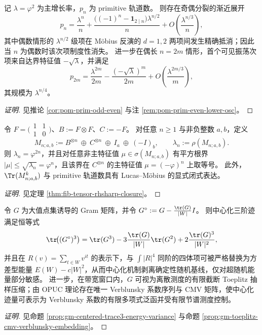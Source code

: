 \begin{conclusion}\label{con:xi-terminal-primitive-parity-cancellation}
记 \(\lambda=\varphi^2\) 为主增长率，\(p_n\) 为 primitive 轨道数。
则存在奇偶分裂的渐近展开
\[
p_n=\frac{\lambda^n}{n}+\frac{\bigl((-1)^n-\mathbf{1}_{2\mid n}\bigr)\lambda^{n/2}}{n}
+O\!\left(\frac{\lambda^{n/3}}{n}\right),
\]
其中偶数情形的 \(\lambda^{n/2}\) 级项在 Möbius 反演的 \(d=1,2\) 两项间发生精确抵消；因此当 \(n\) 为偶数时该次项制度性消失。
进一步在偶长 \(n=2m\) 情形，首个可见振荡次项来自达界特征值 \(-\sqrt{\lambda}\)，并满足
\[
p_{2m}=\frac{\lambda^{2m}}{2m}-\frac{(-\sqrt{\lambda})^{m}}{2m}+O\!\left(\frac{\lambda^{2m/3}}{m}\right),
\]
其规模为 \(\lambda^{n/4}\)。
\end{conclusion}
\begin{proof}[证明]
见推论 \ref{cor:pom-prim-odd-even} 与注 \ref{rem:pom-prim-even-lower-osc}。
\end{proof}

\begin{conclusion}\label{con:xi-terminal-fib-tensor-rhsharp-generator}
令
\(
F=\bigl(\begin{smallmatrix}1&1\\[2pt]1&0\end{smallmatrix}\bigr)
\)、\(B:=F\otimes F\)、\(C:=-F\)。
对任意 \(n\ge 1\) 与非负整数 \(a,b\)，定义
\[
M_{n;a,b}:=B^{\otimes n}\ \oplus\ C^{\otimes n}\ \oplus\ I_a\ \oplus\ (-I)_b,
\qquad
\lambda_n:=\rho(M_{n;a,b}).
\]
则 \(\lambda_n=\varphi^{2n}\)，并且对任意非主特征值 \(\mu\in\sigma(M_{n;a,b})\) 有平方根界 \(|\mu|\le \sqrt{\lambda_n}=\varphi^n\)，且该界在 \(C^{\otimes n}\) 的主特征值 \(\mu=(-\varphi)^n\) 上取等号。
此外，\(\Tr(M_{n;a,b}^k)\) 与 primitive 轨道数具有 Lucas--Möbius 的显式闭式表达。
\end{conclusion}
\begin{proof}[证明]
见定理 \ref{thm:fib-tensor-rhsharp-closure}。
\end{proof}

\begin{conclusion}\label{con:xi-terminal-centered-trace3-opuc-cmv}
令 \(G\) 为大值点集诱导的 Gram 矩阵，并令
\(
G^\circ:=G-\frac{\tr(G)}{|W|}I
\)。
则中心化三阶迹满足恒等式
\[
\tr\!\bigl((G^\circ)^3\bigr)
=\tr(G^3)-3\frac{\tr(G)}{|W|}\tr(G^2)+2\frac{\tr(G)^3}{|W|^2},
\]
并且在 \(R(v)=\sum_{t\in W}v^{it}\) 的表示下，与 \(\int |R|^4\) 同阶的四体项可被严格替换为方差型能量 \(E(W)-c|W|^2\)，从而中心化机制剥离确定性随机基线，仅对超随机能量部分敏感。
进一步，在带宽窗口内，\(G\) 可视为离散测度的有限截断 Toeplitz 抽样压缩；由 OPUC 理论存在唯一 Verblunsky 系数序列与 CMV 矩阵，使中心化迹量可表示为 Verblunsky 系数的有限多项式泛函并受有限节谱测度控制。
\end{conclusion}
\begin{proof}[证明]
见命题 \ref{prop:gm-centered-trace3-energy-variance} 与命题 \ref{prop:gm-toeplitz-cmv-verblunsky-embedding}。
\end{proof}

